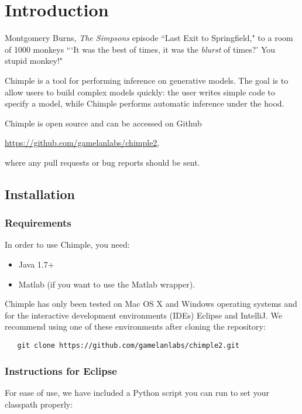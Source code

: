 \chapter{Introduction}

\begin{chapquote}{\scriptsize Montgomery Burns, \textit{The Simpsons} episode ``Last Exit to
    Springfield," to a room of 1000 monkeys}
```It was the best of times, it was the \emph{blurst} of times?' You stupid monkey!"
\end{chapquote}
%
\noindent


Chimple is a tool for performing inference on generative models.
The goal is to allow users to build complex models quickly: the user writes
simple code to specify a model, while Chimple performs automatic inference
under the hood.

Chimple is open source and can be accessed on Github
\begin{center}
\href{https://github.com/gamelanlabs/chimple2}{https://github.com/gamelanlabs/chimple2},
\end{center}
where any pull requests or bug reports should be sent.

\section{Installation}

\subsection{Requirements}
In order to use Chimple, you need:
\begin{itemize}
   \item Java 1.7+
   \item Matlab (if you want to use the Matlab wrapper).
\end{itemize}

Chimple has only been tested on Mac OS X and Windows operating systems
and for the interactive development environments (IDEs) Eclipse and IntelliJ.
We recommend using one of these environments after cloning the repository:
\begin{verbatim}
   git clone https://github.com/gamelanlabs/chimple2.git
\end{verbatim}

\subsection{Instructions for Eclipse}
For ease of use, we have included a Python script you can run to set your
classpath properly:

